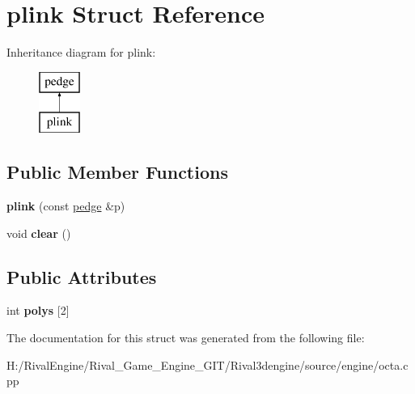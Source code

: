 \hypertarget{structplink}{}\section{plink Struct Reference}
\label{structplink}
Inheritance diagram for plink\+:\begin{figure}[H]
\begin{center}
\leavevmode
\includegraphics[height=2.000000cm]{structplink}
\end{center}
\end{figure}
\subsection*{Public Member Functions}
\begin{DoxyCompactItemize}
\item 
\mbox{\label{structplink_a3fabb20df149d0afce28d881d233f2b0}} 
{\bfseries plink} (const \hyperlink{structpedge}{pedge} \&p)
\item 
\mbox{\label{structplink_af066ce6142f617558a044f84d4752174}} 
void {\bfseries clear} ()
\end{DoxyCompactItemize}
\subsection*{Public Attributes}
\begin{DoxyCompactItemize}
\item 
\mbox{\label{structplink_ae37a2aa96c033b7b076567f0714901a6}} 
int {\bfseries polys} \mbox{[}2\mbox{]}
\end{DoxyCompactItemize}


The documentation for this struct was generated from the following file\+:\begin{DoxyCompactItemize}
\item 
H\+:/\+Rival\+Engine/\+Rival\+\_\+\+Game\+\_\+\+Engine\+\_\+\+G\+I\+T/\+Rival3dengine/source/engine/octa.\+cpp\end{DoxyCompactItemize}
